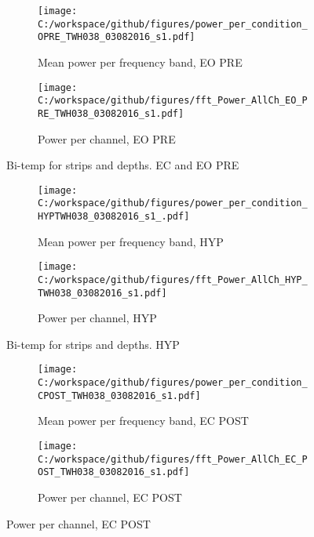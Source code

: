 \documentclass[11pt, onecolumn]{article}
\begin{document}
{\begin{figure}[t!]
\medskip
\begin{subfigure}{0.48\textwidth}
\texttt{[image: C:/workspace/github/figures/power\_per\_condition\_OPRE\_TWH038\_03082016\_s1.pdf]}
\caption{Mean power per frequency band, EO PRE} \label{fig:a}
\end{subfigure}\hspace*{\fill}
\begin{subfigure}{0.48\textwidth}
\texttt{[image: C:/workspace/github/figures/fft\_Power\_AllCh\_EO\_PRE\_TWH038\_03082016\_s1.pdf]}
\caption{Power per channel, EO PRE} \label{fig:b}
\end{subfigure}
\caption{Bi-temp for strips and depths. EC and EO PRE} \label{fig:38PRE}
\end{figure}

\begin{figure}[t!] %
\begin{subfigure}{0.48\textwidth}
\texttt{[image: C:/workspace/github/figures/power\_per\_condition\_HYPTWH038\_03082016\_s1\_.pdf]}
\caption{Mean power per frequency band, HYP} \label{fig:a}
\end{subfigure}\hspace*{\fill}
\begin{subfigure}{0.48\textwidth}
\texttt{[image: C:/workspace/github/figures/fft\_Power\_AllCh\_HYP\_TWH038\_03082016\_s1.pdf]}
\caption{Power per channel, HYP} \label{fig:b}
\end{subfigure}
\caption{Bi-temp for strips and depths. HYP} \label{fig:38HYP}
\end{figure}

\begin{figure}[t!] %
\begin{subfigure}{0.48\textwidth}
\texttt{[image: C:/workspace/github/figures/power\_per\_condition\_CPOST\_TWH038\_03082016\_s1.pdf]}
\caption{Mean power per frequency band, EC POST} \label{fig:a}
\end{subfigure}\hspace*{\fill}
\begin{subfigure}{0.48\textwidth}
\texttt{[image: C:/workspace/github/figures/fft\_Power\_AllCh\_EC\_POST\_TWH038\_03082016\_s1.pdf]}
\caption{Power per channel, EC POST} \label{fig:b}
\end{subfigure}


\end{figure}}
\end{document}
